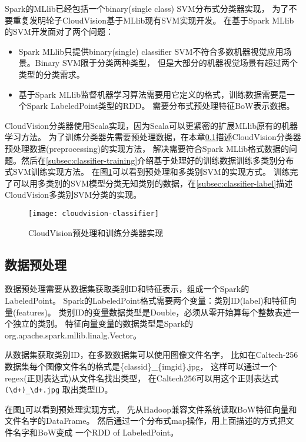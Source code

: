 Spark的MLlib已经包括一个binary(single class) SVM分布式分类器实现，
为了不要重复发明轮子CloudVision基于MLlib现有SVM实现开发。
在基于Spark MLlib的SVM开发面对了两个问题：
\begin{itemize}
  \item Spark MLlib只提供binary(single) classifier SVM不符合多数机器视觉应用场景。Binary SVM限于分类两种类型，
        但是大部分的机器视觉场景有超过两个类型的分类需求。
  \item 基于Spark MLlib监督机器学习算法需要用它定义的格式，训练数据需要是一个Spark LabeledPoint类型的RDD。
        需要分布式预处理特征BoW表示数据。
\end{itemize}

CloudVision分类器使用Scala实现，因为Scala可以更紧密的扩展MLlib原有的机器学习方法。
为了训练分类器先需要预处理数据，在本章\ref{subsec:classifier-preprocessing}描述CloudVision分类器预处理数据(preprocessing)的实现方法，
解决需要符合Spark MLlib格式数据的问题。然后在\ref{subsec:classifier-training}介绍基于处理好的训练数据训练多类别分布式SVM训练实现方法。
在图\ref{fig:cloudvision-classifier}可以看到预处理和多类别SVM的实现方式。
训练完了可以用多类别的SVM模型分类无知类别的数据，在\ref{subsec:classifier-label}描述CloudVision多类别SVM分类的实现。

\begin{figure}[h]
  \centering
    \texttt{[image: cloudvision-classifier]}
  \caption{CloudVision预处理和训练分类器实现}
  \label{fig:cloudvision-classifier}
\end{figure}



\subsection{数据预处理}
\label{subsec:classifier-preprocessing}
数据预处理需要从数据集获取类别ID和特征表示，组成一个Spark的LabeledPoint。
Spark的LabeledPoint格式需要两个变量：类别ID(label)和特征向量(features)。
类别ID的变量数据类型是Double，必须从零开始算每个整数表述一个独立的类别。
特征向量变量的数据类型是Spark的org.apache.spark.mllib.linalg.Vector。

从数据集获取类别ID，在多数数据集可以使用图像文件名字，
比如在Caltech-256数据集每个图像文件名的格式是\{classid\}\_\{imgid\}.jpg，
这样可以通过一个regex(正则表达式)从文件名找出类型，
在Caltech256可以用这个正则表达式\verb|(\d+)_\d+.jpg|
取出类型ID。

在图\ref{fig:cloudvision-classifier}可以看到预处理实现方式，
先从Hadoop兼容文件系统读取BoW特征向量和文件名字的DataFrame。
然后通过一个分布式map操作，用上面描述的方式把文件名字和BoW变成
一个RDD of LabeledPoint。




